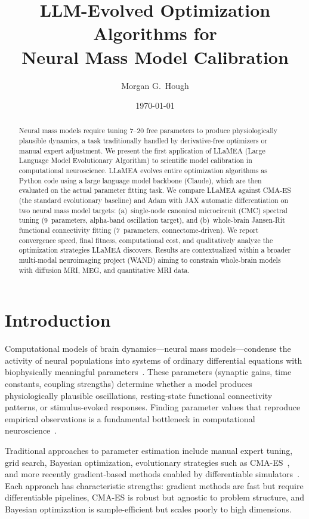 \documentclass[11pt,a4paper]{article}
\title{LLM-Evolved Optimization Algorithms for\\Neural Mass Model Calibration}
\author{Morgan G.\ Hough}
\date{\today}
\begin{document}
\maketitle

\begin{abstract}
Neural mass models require tuning 7--20 free parameters to produce physiologically plausible dynamics, a task traditionally handled by derivative-free optimizers or manual expert adjustment.
We present the first application of LLaMEA (Large Language Model Evolutionary Algorithm) to scientific model calibration in computational neuroscience.
LLaMEA evolves entire optimization algorithms as Python code using a large language model backbone (Claude), which are then evaluated on the actual parameter fitting task.
We compare LLaMEA against CMA-ES (the standard evolutionary baseline) and Adam with JAX automatic differentiation on two neural mass model targets: (a)~single-node canonical microcircuit (CMC) spectral tuning (9~parameters, alpha-band oscillation target), and (b)~whole-brain Jansen-Rit functional connectivity fitting (7~parameters, connectome-driven).
We report convergence speed, final fitness, computational cost, and qualitatively analyze the optimization strategies LLaMEA discovers.
Results are contextualized within a broader multi-modal neuroimaging project (WAND) aiming to constrain whole-brain models with diffusion MRI, MEG, and quantitative MRI data.
\end{abstract}


\section{Introduction}

Computational models of brain dynamics---neural mass models---condense the activity of neural populations into systems of ordinary differential equations with biophysically meaningful parameters~\citep{JansenRit1995,Deco2014}.
These parameters (synaptic gains, time constants, coupling strengths) determine whether a model produces physiologically plausible oscillations, resting-state functional connectivity patterns, or stimulus-evoked responses.
Finding parameter values that reproduce empirical observations is a fundamental bottleneck in computational neuroscience~\citep{Sanz-Leon2015}.

Traditional approaches to parameter estimation include manual expert tuning, grid search, Bayesian optimization, evolutionary strategies such as CMA-ES~\citep{Hansen2006}, and more recently gradient-based methods enabled by differentiable simulators~\citep{Griffiths2024}.
Each approach has characteristic strengths: gradient methods are fast but require differentiable pipelines, CMA-ES is robust but agnostic to problem structure, and Bayesian optimization is sample-efficient but scales poorly to high dimensions.
\end{document}
